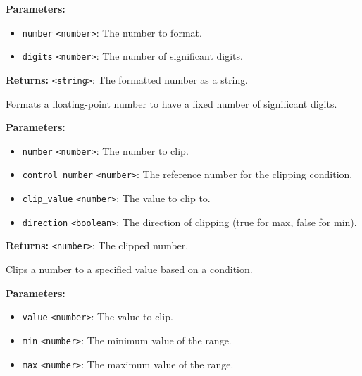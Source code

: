 \documentclass[12pt,a4paper]{article}
\begin{document}
\noindent \textbf{Parameters:}
\begin{itemize}
  \item \texttt{number} \texttt{<number>}: The number to format.
  \item \texttt{digits} \texttt{<number>}: The number of significant digits.
\end{itemize}

\noindent \textbf{Returns:} \texttt{<string>}: The formatted number as a string.

\noindent Formats a floating-point number to have a fixed number of significant digits.

\vspace{5mm}
\noindent {}


\noindent \textbf{Parameters:}
\begin{itemize}
  \item \texttt{number} \texttt{<number>}: The number to clip.
  \item \texttt{control\_number} \texttt{<number>}: The reference number for the clipping condition.
  \item \texttt{clip\_value} \texttt{<number>}: The value to clip to.
  \item \texttt{direction} \texttt{<boolean>}: The direction of clipping (true for max, false for min).
\end{itemize}

\noindent \textbf{Returns:} \texttt{<number>}: The clipped number.

\noindent Clips a number to a specified value based on a condition.

\vspace{5mm}
\noindent {}


\noindent \textbf{Parameters:}
\begin{itemize}
  \item \texttt{value} \texttt{<number>}: The value to clip.
  \item \texttt{min} \texttt{<number>}: The minimum value of the range.
  \item \texttt{max} \texttt{<number>}: The maximum value of the range.
\end{itemize}
\end{document}
